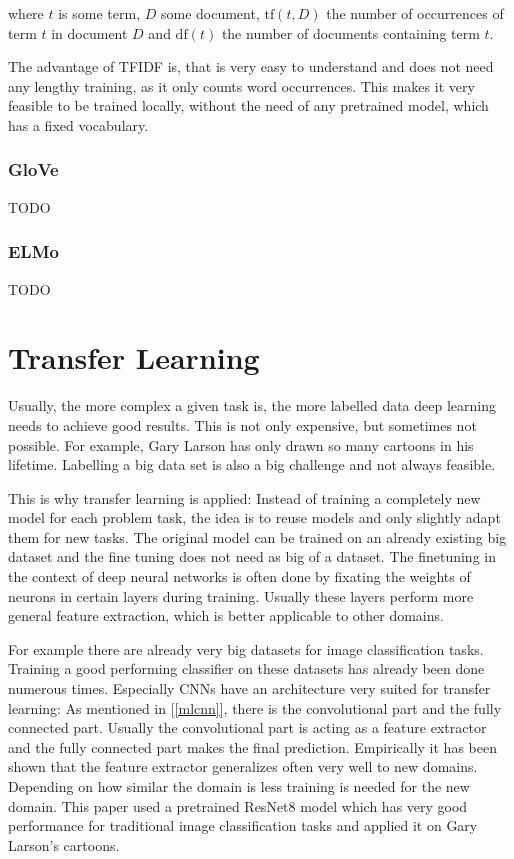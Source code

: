 \documentclass[draft,final,oneside]{vutinfth} %
\begin{document}
where $t$ is some term, $D$ some document, $\text{tf}(t, D)$ the number of occurrences of term $t$ in document $D$ and $\text{df}(t)$ the number of documents containing term $t$.

The advantage of TFIDF is, that is very easy to understand and does not need any lengthy training, as it only counts word occurrences. This makes it very feasible to be trained locally, without the need of any pretrained model, which has a fixed vocabulary.

\subsubsection{GloVe}
TODO

\subsubsection{ELMo}
TODO




\section{Transfer Learning} \label{transferlearning}

Usually, the more complex a given task is, the more labelled data deep learning needs to achieve good results. This is not only expensive, but sometimes not possible. For example, Gary Larson has only drawn so many cartoons in his lifetime. Labelling a big data set is also a big challenge and not always feasible.

This is why transfer learning is applied: Instead of training a completely new model for each problem task, the idea is to reuse models and only slightly adapt them for new tasks. The original model can be trained on an already existing big dataset and the fine tuning does not need as big of a dataset. The finetuning in the context of deep neural networks is often done by fixating the weights of neurons in certain layers during training. Usually these layers perform more general feature extraction, which is better applicable to other domains.

For example there are already very big datasets for image classification tasks. Training a good performing classifier on these datasets has already been done numerous times. Especially CNNs have an architecture very suited for transfer learning: As mentioned in [\ref{mlcnn}], there is the convolutional part and the fully connected part. Usually the convolutional part is acting as a feature extractor and the fully connected part makes the final prediction. Empirically it has been shown that the feature extractor generalizes often very well to new domains. Depending on how similar the domain is less training is needed for the new domain. This paper used a pretrained ResNet8 model which has very good performance for traditional image classification tasks and applied it on Gary Larson's cartoons.
\end{document}
